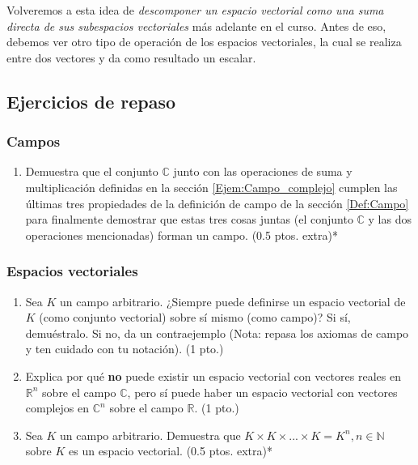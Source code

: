 \documentclass[12pt]{article}
\begin{document}
Volveremos a esta idea de \emph{descomponer un espacio vectorial como una suma directa de sus subespacios vectoriales} más adelante en el curso. Antes de eso, debemos ver otro tipo de operación de los espacios vectoriales, la cual se realiza entre dos vectores y da como resultado un escalar.

\subsection{Ejercicios de repaso}

\subsubsection{Campos}

\begin{enumerate}
    \item Demuestra que el conjunto $\mathbb{C}$ junto con las operaciones de suma y multiplicación definidas en la sección \ref{Ejem:Campo_complejo} cumplen las últimas tres propiedades de la definición de campo de la sección \ref{Def:Campo} para finalmente demostrar que estas tres cosas juntas (el conjunto $\mathbb{C}$ y las dos operaciones mencionadas) forman un campo. (0.5 ptos. extra)*
\end{enumerate}

\subsubsection{Espacios vectoriales} \label{Ejer:Espacios_vectoriales}

\begin{enumerate}
    \item Sea $K$ un campo arbitrario. ¿Siempre puede definirse un espacio vectorial de $K$ (como conjunto vectorial) sobre sí mismo (como campo)? Si sí, demuéstralo. Si no, da un contraejemplo (Nota: repasa los axiomas de campo y ten cuidado con tu notación). (1 pto.)
    \item Explica por qué \textbf{no} puede existir un espacio vectorial con vectores reales en $\mathbb{R}^n$ sobre el campo $\mathbb{C}$, pero sí puede haber un espacio vectorial con vectores complejos en $\mathbb{C}^n$ sobre el campo $\mathbb{R}$. (1 pto.)
    \item Sea $K$ un campo arbitrario. Demuestra que $K\times K\times ...\times K=K^n, n\in\mathbb{N}$ sobre $K$ es un espacio vectorial. (0.5 ptos. extra)*
\end{enumerate}
\end{document}
